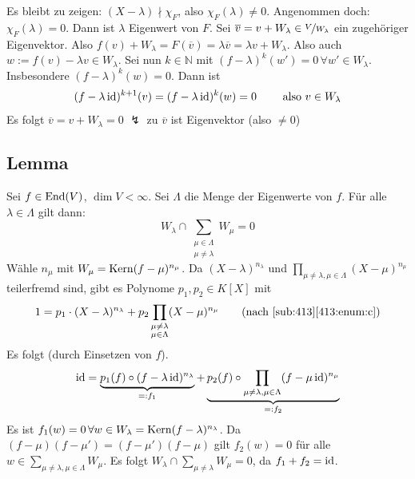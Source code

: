 Es bleibt zu zeigen: $(X- \lambda ) \nmid \chi_F$, also $\chi_F (\lambda  ) \not= 0$. Angenommen doch: $\chi_F (\lambda ) =0$. Dann ist $\lambda $ Eigenwert von $F$.
Sei $\overline{v} = v + W_{\lambda } \in \nicefrac{V}{W_\lambda }$ ein zugehöriger Eigenvektor. Also 
$f(v) + W_\lambda = F(\overline{v} ) = \lambda  \overline{v} = \lambda v + W_\lambda $. Also auch $w := f(v)- \lambda v \in W_\lambda $. Sei nun $k \in \mathds{N}$ mit
$(f- \lambda )^k (w') = 0 \, \forall w' \in W_\lambda  $. Insbesondere $(f- \lambda )^k (w) =0$. Dann ist 
\[
	(f- \lambda \operatorname{id})^{k+1} (v) = (f- \lambda \operatorname{id})^k (w) = 0 \qquad \text{ also } v \in W_\lambda 
\]
Es folgt $\overline{v} = v + W_\lambda = 0$ {\large $\lightning$} zu $\overline{v} $ ist Eigenvektor (also $\not=0$) \bewende

\subsection[Lemma über den Schnitt von verallgemeinerten Eigenräumen]{Lemma} %
\label{sub:75}
Sei $f \in \operatorname{End}(V)$, $\dim V < \infty$. Sei $\Lambda$ die Menge der Eigenwerte von $f$. Für alle $\lambda  \in \Lambda$ gilt dann:
\[
	W_\lambda  \cap \sum_{\substack{\mu \in \Lambda \\ \mu \not= \lambda}} W_\mu = 0 
\]
Wähle $n_\mu$ mit $W_\mu = \operatorname{Kern} (f- \mu)^{n_\mu}$. Da $(X- \lambda )^{n_\lambda }$ und $\prod_{\mu \not= \lambda , \mu \in \Lambda} (X- \mu)^{n_\mu}$
teilerfremd sind, gibt es Polynome $p_1, p_2 \in K[X]$ mit 
\[
	1 = p_1 \cdot (X- \lambda )^{n_\lambda } + p_2 \prod_{\substack{\mu \not= \lambda \\ \mu \in \Lambda}} (X- \mu)^{n_\mu} \tag{nach \ref{sub:413}\ref{413:enum:c}}
\]
Es folgt (durch Einsetzen von $f$).
\[
	\operatorname{id} = \underbrace{p_1(f) \circ (f- \lambda \operatorname{id} )^{n_\lambda }}_{=: f_1} + \underbrace{p_2 (f) \circ  \prod_{\substack{\mu \not= \lambda , \mu \in \Lambda}} (f- \mu \operatorname{id})^{n_\mu}}_{=: f_2}
\]
Es ist $f_1 (w) =0 \, \forall w \in W_\lambda = \operatorname{Kern} (f- \lambda )^{n_\lambda }$. Da $(f- \mu)(f- \mu')= (f- \mu')(f- \mu)$ gilt $f_2 (w) = 0$ für alle 
$w \in \sum_{\mu \not=\lambda , \mu \in \Lambda} W_\mu  $. Es folgt $W_\lambda  \cap \sum_{\mu \not= \lambda} W_\mu = 0 $, da $f_1 + f_2 = \operatorname{id}$. \bewende


